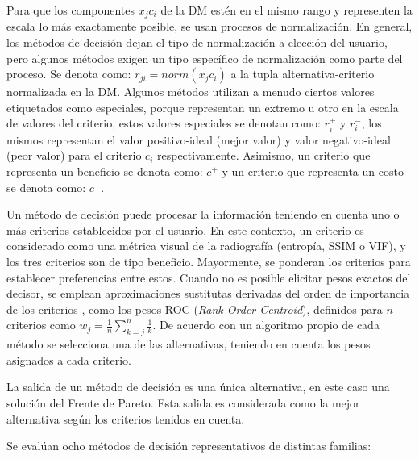 \documentclass[sigplan,screen]{acmart}
\begin{document}
\noindent Para que los componentes $x_jc_i$ de la DM estén en el mismo rango y representen la escala lo más exactamente posible, se usan procesos de normalización. En general, los métodos de decisión dejan el tipo de normalización a elección del usuario, pero algunos métodos exigen un tipo específico de normalización como parte del proceso. Se denota como: $r_{ji}=norm(x_jc_i)$ a la tupla alternativa-criterio normalizada en la DM. Algunos métodos utilizan a menudo ciertos valores etiquetados como especiales, porque representan un extremo u otro en la escala de valores del criterio, estos valores especiales se denotan como: $r_i^+$ y $r_i^-$, los mismos representan el valor positivo-ideal (mejor valor) y valor negativo-ideal (peor valor) para el criterio $c_i$ respectivamente. Asimismo, un criterio que representa un beneficio se denota como: $c^+$ y un criterio que representa un costo se denota como: $c^-$.\par
Un método de decisión puede procesar la información teniendo en cuenta uno o más criterios establecidos por el usuario. En este contexto, un criterio es considerado como una métrica visual de la radiografía (entropía, SSIM o VIF), y los tres criterios son de tipo beneficio. Mayormente, se ponderan los criterios para establecer preferencias entre estos. Cuando no es posible elicitar pesos exactos del decisor, se emplean aproximaciones sustitutas derivadas del orden de importancia de los criterios \cite{Roberts2002}, como los pesos ROC (\textit{Rank Order Centroid}), definidos para $n$ criterios como $w_j=\frac{1}{n}\sum_{k=j}^{n}\frac{1}{k}$. De acuerdo con un algoritmo propio de cada método se selecciona una de las alternativas, teniendo en cuenta los pesos asignados a cada criterio.\par
La salida de un método de decisión es una única alternativa, en este caso una solución del Frente de Pareto. Esta salida es considerada como la mejor alternativa según los criterios tenidos en cuenta.\par

Se evalúan ocho métodos de decisión representativos de distintas familias:
\end{document}
